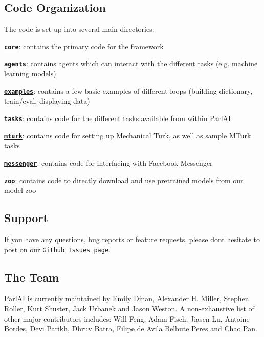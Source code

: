 \subsection*{Code Organization}

The code is set up into several main directories\+:


\begin{DoxyItemize}
\item \href{./parlai/core}{\tt {\bfseries core}}\+: contains the primary code for the framework
\item \href{./parlai/agents}{\tt {\bfseries agents}}\+: contains agents which can interact with the different tasks (e.\+g. machine learning models)
\item \href{./parlai/examples}{\tt {\bfseries examples}}\+: contains a few basic examples of different loops (building dictionary, train/eval, displaying data)
\item \href{./parlai/tasks}{\tt {\bfseries tasks}}\+: contains code for the different tasks available from within Parl\+AI
\item \href{./parlai/mturk}{\tt {\bfseries mturk}}\+: contains code for setting up Mechanical Turk, as well as sample M\+Turk tasks
\item \href{./parlai/messenger}{\tt {\bfseries messenger}}\+: contains code for interfacing with Facebook Messenger
\item \href{./parlai/zoo}{\tt {\bfseries zoo}}\+: contains code to directly download and use pretrained models from our model zoo
\end{DoxyItemize}

\subsection*{Support}

If you have any questions, bug reports or feature requests, please don\textquotesingle{}t hesitate to post on our \href{https://github.com/facebookresearch/ParlAI/issues}{\tt Github Issues page}.

\subsection*{The Team}

Parl\+AI is currently maintained by Emily Dinan, Alexander H. Miller, Stephen Roller, Kurt Shuster, Jack Urbanek and Jason Weston. A non-\/exhaustive list of other major contributors includes\+: Will Feng, Adam Fisch, Jiasen Lu, Antoine Bordes, Devi Parikh, Dhruv Batra, Filipe de Avila Belbute Peres and Chao Pan.

